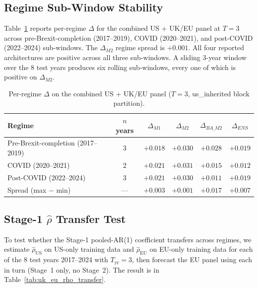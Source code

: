 \documentclass[11pt,a4paper]{article}
\begin{document}
\subsection{Regime Sub-Window Stability}

Table~\ref{tab:uk_eu_regime_combined} reports per-regime $\Delta$ for the combined US + UK/EU panel at $T=3$ across pre-Brexit-completion (2017--2019), COVID (2020--2021), and post-COVID (2022--2024) sub-windows. The $\Delta_{M2}$ regime spread is $+0.001$. All four reported architectures are positive across all three sub-windows. A sliding 3-year window over the 8 test years produces six rolling sub-windows, every one of which is positive on $\Delta_{M2}$.

\begin{table}[H]
\centering
\caption{Per-regime $\Delta$ on the combined US + UK/EU panel ($T=3$, us\_inherited block partition).}
\label{tab:uk_eu_regime_combined}
\small
\begin{tabular}{lccccc}
\toprule
Regime & $n$ years & $\Delta_{M1}$ & $\Delta_{M2}$ & $\Delta_{BA\_M2}$ & $\Delta_{ENS}$ \\
\midrule
Pre-Brexit-completion (2017--2019) & 3 & $+0.018$ & $+0.030$ & $+0.028$ & $+0.019$ \\
COVID (2020--2021) & 2 & $+0.021$ & $+0.031$ & $+0.015$ & $+0.012$ \\
Post-COVID (2022--2024) & 3 & $+0.021$ & $+0.030$ & $+0.011$ & $+0.019$ \\
\midrule
Spread (max $-$ min) & --- & $+0.003$ & $+0.001$ & $+0.017$ & $+0.007$ \\
\bottomrule
\end{tabular}
\end{table}

\subsection{Stage-1 $\hat\rho$ Transfer Test}

To test whether the Stage-1 pooled-AR(1) coefficient transfers across regimes, we estimate $\hat\rho_{\text{US}}$ on US-only training data and $\hat\rho_{\text{EU}}$ on EU-only training data for each of the 8 test years 2017--2024 with $T_{\text{yr}}=3$, then forecast the EU panel using each in turn (Stage~1 only, no Stage~2). The result is in Table~\ref{tab:uk_eu_rho_transfer}.
\end{document}

